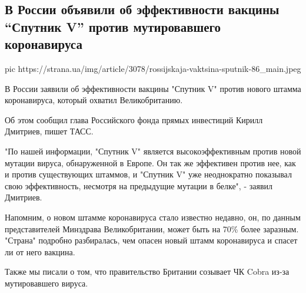  
 
 
 
 
 
\subsection{В России объявили об эффективности вакцины \enquote{Спутник V} против мутировавшего коронавируса}
\label{sec:21_12_2020.news.ua.strana.1.russia_new_shtamm_covid_effektivnost}

\ifcmt
pic https://strana.ua/img/article/3078/rossijskaja-vaktsina-sputnik-86_main.jpeg
\fi

В России заявили об эффективности вакцины "Спутник V" против нового штамма
коронавируса, который охватил Великобританию.

Об этом сообщил глава Российского фонда прямых инвестиций Кирилл Дмитриев,
пишет ТАСС.

"По нашей информации, "Спутник V" является высокоэффективным против новой
мутации вируса, обнаруженной в Европе. Он так же эффективен против нее, как и
против существующих штаммов, и "Спутник V" уже неоднократно показывал свою
эффективность, несмотря на предыдущие мутации в белке", - заявил Дмитриев. 

Напомним, о новом штамме коронавируса стало известно недавно, он, по данным
представителей Минздрава Великобритании, может быть на 70\% более заразным.
"Страна" подробно разбиралась, чем опасен новый штамм коронавируса и спасет ли
от него вакцина.

Также мы писали о том, что правительство Британии созывает ЧК Cobra из-за
мутировавшего вируса.

